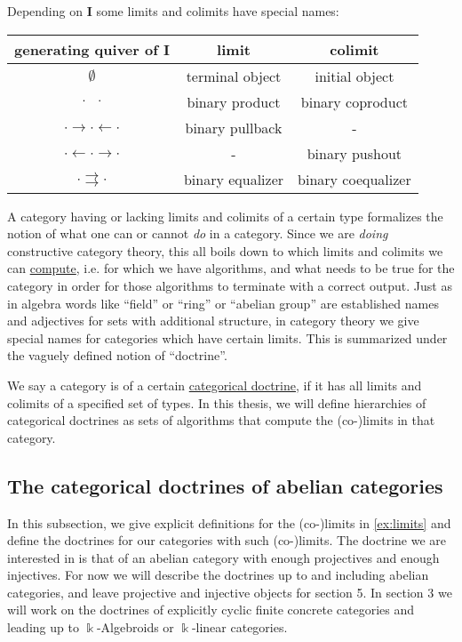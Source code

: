 \begin{example}\label{ex:limits}
Depending on \textbf{I} some limits and colimits have special names:
\begin{center}
\begin{tabular}{c|c|c}
generating quiver of $\mathbf{I}$ & limit & colimit \\
\hline
$\emptyset$ & terminal object & initial object \\
$\cdot \text{\phantom{$\rightarrow$}} \cdot$ & binary product & binary coproduct \\
$\cdot \rightarrow \cdot \leftarrow \cdot$ & binary pullback & - \\
$\cdot \leftarrow \cdot \rightarrow \cdot$  & - & binary pushout \\
$ \cdot \rightrightarrows \cdot$ & binary equalizer & binary coequalizer
\end{tabular}
\end{center}
\end{example}

A category having or lacking limits and colimits of a certain type formalizes the notion of what one can or cannot \textit{do} in a category.
Since we are \textit{doing} constructive category theory, this all boils down to which limits and colimits we can \ul{compute}, i.e. for which we
have algorithms, and what needs to be true for the category in order for those algorithms to terminate with a correct output.
Just as in algebra words like ``field'' or ``ring'' or ``abelian group'' are established names and adjectives for sets with additional structure,
in category theory we give special names for categories which have certain limits. This is summarized under the vaguely defined
notion of ``doctrine''.

\begin{definition}
We say a category is of a certain \ul{categorical doctrine}, if it has all limits and colimits of a specified set of types.
In this thesis, we will define hierarchies of categorical doctrines as sets of algorithms that compute the (co-)limits in that category.
\end{definition}

\subsection{The categorical doctrines of abelian categories}

In this subsection, we give explicit definitions for the (co-)limits in \ref{ex:limits} and define the
doctrines for our categories with such (co-)limits. The doctrine we are interested in is that of an abelian category with
enough projectives and enough injectives. For now we will describe the doctrines up to and including abelian categories, and
leave projective and injective objects for section 5. In section 3 we will work on the doctrines of explicitly cyclic finite concrete
categories and leading up to $\Bbbk$-Algebroids or $\Bbbk$-linear categories.

